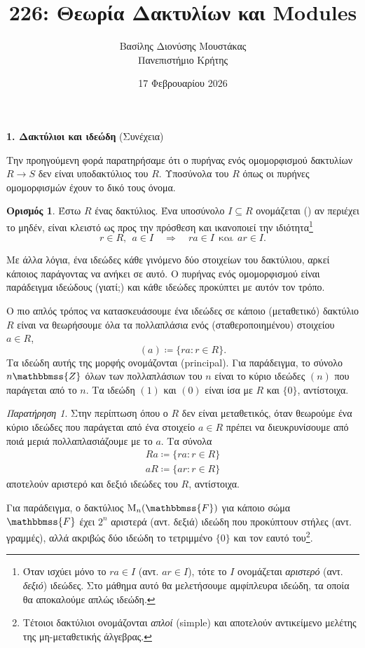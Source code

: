 \documentclass[12pt,a4paper,reqno]{amsart}
\title{226: Θεωρία Δακτυλίων και Modules}
\author[Β.~Δ. Μουστακας]{Βασίλης Διονύσης Μουστάκας \\ Πανεπιστήμιο Κρήτης}
\date{17 Φεβρουαρίου 2026}
\theoremstyle{definition}
\newtheorem{definition}[theorem]{Ορισμός}
\theoremstyle{remark}
\newtheorem*{remark}{Παρατήρηση}
\numberwithin{theorem}{section}
\numberwithin{exercise}{section}
\numberwithin{equation}{section}
\newcommand{\ZZ}{\mathbbmss{Z}}
\newcommand{\FF}{\mathbbmss{F}}
\newcommand{\rmM}{\mathrm{M}}
\renewcommand{\to}{\rightarrow}
\newcommand{\then}{\Rightarrow}
\newcommand{\defn}[1]{{\color{mylightblue}{#1}}}
\begin{document}
\begingroup
\def\uppercasenonmath#1{} %
\let\MakeUppercase\relax %
\maketitle
\endgroup

\setcounter{section}{1}
\setcounter{theorem}{4}
\begin{center}
    \textbf{1. Δακτύλιοι και ιδεώδη
} (Συνέχεια)
\end{center}

Την προηγούμενη φορά παρατηρήσαμε ότι ο πυρήνας ενός ομομορφισμού δακτυλίων $R \to S$ δεν είναι υποδακτύλιος του $R$. Υποσύνολα του $R$ όπως οι πυρήνες ομομορφισμών έχουν το δικό τους όνομα.
\begin{definition}
    \label{def:ideal}
    Έστω $R$ ένας δακτύλιος. Ένα υποσύνολο $Ι \subseteq R$ ονομάζεται (\defn{αμφίπλευρο}) \defn{ιδεώδες} αν περιέχει το μηδέν, είναι κλειστό ως προς την πρόσθεση και ικανοποιεί την ιδιό\-τητα\footnote{Όταν ισχύει μόνο το $ra \in I$ (αντ. $ar \in I$), τότε το $I$ ονομάζεται \emph{αριστερό} (αντ. \emph{δεξιό}) ιδεώδες. Στο μάθημα αυτό θα μελετήσουμε αμφίπλευρα ιδεώδη, τα οποία θα αποκαλούμε απλώς ιδεώδη.} 
    \[
    r \in R, \ \ a \in I \quad \then \quad ra \in I \ \ \text{και} \ \ ar \in I.
    \]
\end{definition}

Με άλλα λόγια, ένα ιδεώδες  κάθε γινόμενο δύο στοιχείων του δακτύλιου, αρκεί κάποιος παράγοντας να ανήκει σε αυτό. Ο πυρήνας ενός ομομορφισμού είναι παρά\-δειγμα ιδεώδους (γιατί;) και κάθε ιδεώδες προκύπτει με αυτόν τον τρόπο.

Ο πιο απλός τρόπος να κατασκευάσουμε ένα ιδεώδες σε κάποιο (μεταθετικό) δακτύλιο $R$ είναι να θεωρήσουμε όλα τα πολλαπλάσια ενός (σταθεροποιημένου) στοιχείου $a \in R$, 
\[
\left(a\right) \coloneqq \{ra : r \in R\}.
\]
Τα ιδεώδη αυτής της μορφής ονομάζονται \defn{κύρια} (principal). Για παράδειγμα, το σύνολο $n\ZZ$ όλων των πολλαπλάσιων του $n$ είναι το κύριο ιδεώδες $(n)$ που παράγεται από το $n$. Τα ιδεώδη $(1)$ και $(0)$ είναι ίσα με $R$ και $\{0\}$, αντίστοιχα.

\begin{remark}
    Στην περίπτωση όπου ο $R$ δεν είναι μεταθετικός, όταν θεωρούμε ένα κύριο ιδεώδες που παράγεται από ένα στοιχείο $a \in R$ πρέπει να διευκρυνίσουμε από ποιά μεριά πολλαπλασιάζουμε με το $a$. Τα σύνολα 
    \begin{align*}
        Ra \coloneqq \{ra : r \in R\} \\
        aR \coloneqq \{ar : r \in R\}
    \end{align*}
    αποτελούν αριστερό και δεξιό ιδεώδες του $R$, αντίστοιχα. 

    Για παράδειγμα, ο δακτύλιος $\rmM_n(\FF)$ για κάποιο σώμα $\FF$ έχει $2^n$ αριστερά (αντ. δεξιά) ιδεώδη που προκύπτουν  στήλες (αντ. γραμμές), αλλά ακριβώς δύο ιδεώδη το τετριμμένο $\{0\}$ και τον εαυτό του\footnote{Τέτοιοι δακτύλιοι ονομάζονται \emph{απλοί} (simple) και αποτελούν αντικείμενο μελέτης της μη-μεταθετικής άλγεβρας.}. 
\end{remark}
\end{document}
